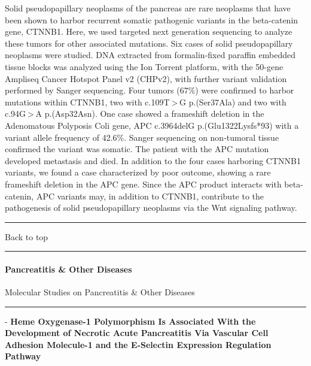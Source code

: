 \documentclass[]{article}
\let\oldparagraph\paragraph
\renewcommand{\paragraph}[1]{\oldparagraph{#1}\mbox{}}
\begin{document}
Solid pseudopapillary neoplasms of the pancreas are rare neoplasms that
have been shown to harbor recurrent somatic pathogenic variants in the
beta-catenin gene, CTNNB1. Here, we used targeted next generation
sequencing to analyze these tumors for other associated mutations. Six
cases of solid pseudopapillary neoplasms were studied. DNA extracted
from formalin-fixed paraffin embedded tissue blocks was analyzed using
the Ion Torrent platform, with the 50-gene Ampliseq Cancer Hotspot Panel
v2 (CHPv2), with further variant validation performed by Sanger
sequencing. Four tumors (67\%) were confirmed to harbor mutations within
CTNNB1, two with c.109T \textgreater{} G p.(Ser37Ala) and two with
c.94G \textgreater{} A p.(Asp32Asn). One case showed a frameshift
deletion in the Adenomatous Polyposis Coli gene, APC c.3964delG
p.(Glu1322Lysfs*93) with a variant allele frequency of 42.6\%. Sanger
sequencing on non-tumoral tissue confirmed the variant was somatic. The
patient with the APC mutation developed metastasis and died. In addition
to the four cases harboring CTNNB1 variants, we found a case
characterized by poor outcome, showing a rare frameshift deletion in the
APC gene. Since the APC product interacts with beta-catenin, APC
variants may, in addition to CTNNB1, contribute to the pathogenesis of
solid pseudopapillary neoplasms via the Wnt signaling pathway.

{}

{}

\begin{center}\rule{0.5\linewidth}{\linethickness}\end{center}

Back to top

\begin{center}\rule{0.5\linewidth}{\linethickness}\end{center}

\pagebreak

\hypertarget{pancreatitis-other-diseases-1}{%
\paragraph{Pancreatitis \& Other
Diseases}\label{pancreatitis-other-diseases-1}}

Molecular Studies on Pancreatitis \& Other Diseases

\begin{center}\rule{0.5\linewidth}{\linethickness}\end{center}

 - \textbf{Heme Oxygenase-1 Polymorphism Is Associated With the
Development of Necrotic Acute Pancreatitis Via Vascular Cell Adhesion
Molecule-1 and the E-Selectin Expression Regulation Pathway}
\end{document}

